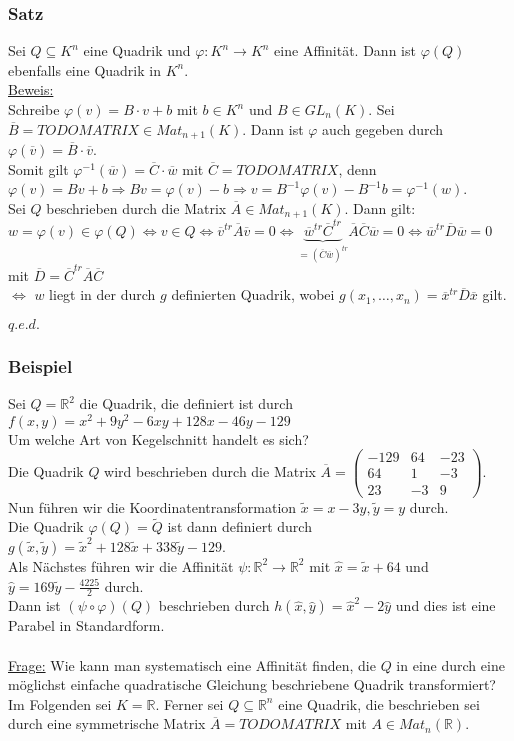 \documentclass[a4paper]{article}
\newcommand{\ul}{\underline}
\renewcommand{\proof}{\ul{Beweis:}\\}
\renewcommand{\qed}{\begin{flushright}
\ul{\(q.e.d.\)}
\end{flushright}}
\let\phi\varphi
\begin{document}
\subsubsection{Satz}
Sei \(Q\subseteq K^n\) eine Quadrik und \(\phi:K^n\rightarrow K^n\) eine Affinität. Dann ist \(\phi(Q)\) ebenfalls eine Quadrik in \(K^n\).\\
\proof
Schreibe \(\phi(v)=B\cdot v + b\) mit \(b\in K^n\) und \(B\in GL_n(K)\). Sei \(\overline{B}=TODO MATRIX\in Mat_{n+1}(K)\). Dann ist \(\phi\) auch gegeben durch \(\phi(\overline{v})=\overline{B}\cdot\overline{v}\).\\
Somit gilt \(\phi^{-1}(\overline{w})=\overline{C}\cdot\overline{w}\) mit \(\overline{C}=TODO MATRIX\), denn \(\phi(v)=Bv+b\Rightarrow Bv=\phi(v)-b\Rightarrow v=B^{-1}\phi(v)-B^{-1}b=\phi^{-1}(w)\).\\
Sei \(Q\) beschrieben durch die Matrix \(\overline{A}\in Mat_{n+1}(K)\). Dann gilt: \(w=\phi(v)\in\phi(Q)\Leftrightarrow v\in Q\Leftrightarrow \overline{v}^{tr}\overline{A}\overline{v}=0\Leftrightarrow\underbrace{\overline{w}^{tr}\overline{C}^{tr}}_{=(\overline{C}\overline{w})^{tr}}\overline{A}\overline{C}\overline{w}=0\Leftrightarrow\overline{w}^{tr}\overline{D}\overline{w}=0\) mit \(\overline{D}=\overline{C}^{tr}\overline{A}\overline{C}\)\\
\(\Leftrightarrow\) \(w\) liegt in der durch \(g\) definierten Quadrik, wobei \(g(x_1,\dots,x_n)=\overline{x}^{tr}\overline{D}\overline{x}\) gilt.
\qed
\subsubsection{Beispiel}
Sei \(Q=\mathbb{R}^2\) die Quadrik, die definiert ist durch \(f(x,y)=x^2+9y^2-6xy+128x-46y-129\)\\
Um welche Art von Kegelschnitt handelt es sich?\\
Die Quadrik \(Q\) wird beschrieben durch die Matrix \(\overline{A}=\begin{pmatrix}
-129 & 64 & -23\\
64 & 1 & -3\\
23 & -3 & 9
\end{pmatrix}\).\\
Nun führen wir die Koordinatentransformation \(\tilde{x}=x-3y,\tilde{y}=y\) durch.\\
Die Quadrik \(\phi(Q)=\tilde{Q}\) ist dann definiert durch \(g(\tilde{x},\tilde{y})=\tilde{x}^2+128\tilde{x}+338\tilde{y}-129\).\\
Als Nächstes führen wir die Affinität \(\psi:\mathbb{R}^2\rightarrow\mathbb{R}^2\) mit \(\hat{x}=\tilde{x}+64\) und \(\hat{y}=169\tilde{y}-\frac{4225}{2}\) durch.\\
Dann ist \((\psi\circ\phi)(Q)\) beschrieben durch \(h(\hat{x},\hat{y})=\hat{x}^2-2\hat{y}\) und dies ist eine Parabel in Standardform.\\\\
\ul{Frage:} Wie kann man systematisch eine Affinität finden, die \(Q\) in eine durch eine möglichst einfache quadratische Gleichung beschriebene Quadrik transformiert?\\
Im Folgenden sei \(K=\mathbb{R}\). Ferner sei \(Q\subseteq\mathbb{R}^n\) eine Quadrik, die beschrieben sei durch eine symmetrische Matrix \(\overline{A}=TODO MATRIX\) mit \(A\in Mat_n(\mathbb{R})\).
\end{document}
